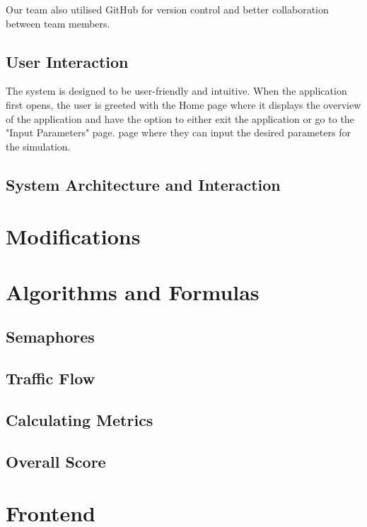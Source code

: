 \documentclass{article}
\begin{document}
        Our team also utilised GitHub for version control and better collaboration between team members.

    \subsection{User Interaction}

        The system is designed to be user-friendly and intuitive. When the application first opens, the user is greeted with the Home page where it displays the overview of the application and have the option to either exit the application or go to the "Input Parameters" page.
        page where they can input the desired parameters for the simulation.
        
    \subsection{System Architecture and Interaction}

\section{Modifications}

\section{Algorithms and Formulas}

    \subsection{Semaphores}

    \subsection{Traffic Flow}

    \subsection{Calculating Metrics}

    \subsection{Overall Score}

\section{Frontend}
\end{document}

